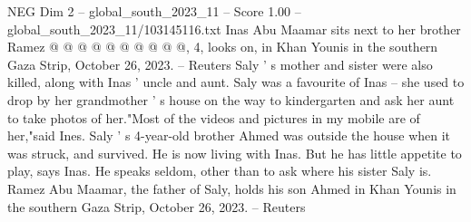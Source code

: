 \begin{textsample}{NEG Dim 2 – global\_south\_2023\_11 – Score 1.00 – global\_south\_2023\_11/103145116.txt}
Inas Abu Maamar sits next to her brother Ramez @ @ @ @ @ @ @ @ @ @, 4, looks on, in Khan Younis in the southern Gaza Strip, October 26, 2023. -- Reuters Saly ' s mother and sister were also killed, along with Inas ' uncle and aunt.
Saly was a favourite of Inas -- she used to drop by her grandmother ' s house on the way to kindergarten and ask her aunt to take photos of her."Most of the videos and pictures in my mobile are of her,"said Ines.
Saly ' s 4-year-old brother Ahmed was outside the house when it was struck, and survived.
He is now living with Inas.
But he has little appetite to play, says Inas.
He speaks seldom, other than to ask where his sister Saly is.
Ramez Abu Maamar, the father of Saly, holds his son Ahmed in Khan Younis in the southern Gaza Strip, October 26, 2023. -- Reuters

\end{textsample}
